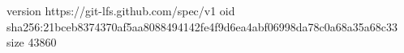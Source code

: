 version https://git-lfs.github.com/spec/v1
oid sha256:21bceb8374370af5aa8088494142fe4f9d6ea4abf06998da78c0a68a35a68c33
size 43860
